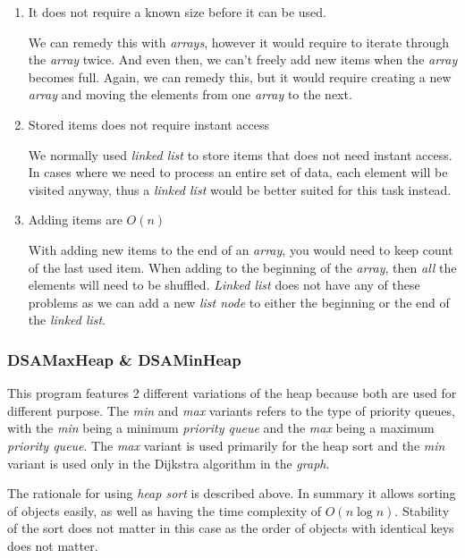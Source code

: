 \documentclass[a4paper, 12pt, titlepage]{article}
\begin{document}
\begin{enumerate}
    \item
    It does not require a known size before it can be used.

    We can remedy this with \textit{arrays}, however it would require to
    iterate through the \textit{array} twice. And even then, we can't
    freely add new items when the \textit{array} becomes full. Again, we
    can remedy this, but it would require creating a new \textit{array}
    and moving the elements from one \textit{array} to the next.

    \item
    Stored items does not require instant access

    We normally used \textit{linked list} to store items that does not
    need instant access. In cases where we need to process an entire set
    of data, each element will be visited anyway, thus a \textit{linked list}
    would be better suited for this task instead.\\

    \item
    Adding items are $O(n)$

    With adding new items to the end of an \textit{array}, you would need to
    keep count of the last used item. When adding to the beginning of the
    \textit{array}, then \textit{all} the elements will need to be shuffled.
    \textit{Linked list} does not have any of these problems as we can
    add a new \textit{list node} to either the beginning or the end of the
    \textit{linked list}.
\end{enumerate}

\subsubsection{DSAMaxHeap \& DSAMinHeap}

This program features 2 different variations of the heap because both
are used for different purpose. The \textit{min} and \textit{max} variants
refers to the type of priority queues, with the \textit{min} being a minimum
\textit{priority queue} and the \textit{max} being a maximum
\textit{priority queue}. The \textit{max} variant is used primarily for the
heap sort and the \textit{min} variant is used only in the Dijkstra algorithm
in the \textit{graph}.

The rationale for using \textit{heap sort} is described above. In summary it
allows sorting of objects easily, as well as having the time complexity of
$O(n\log{}n)$. Stability of the sort does not matter in this case as the order
of objects with identical keys does not matter.
\end{document}
